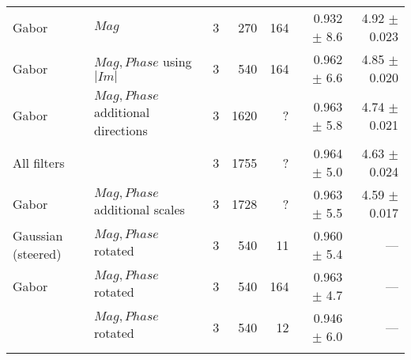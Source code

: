 \begin{tabularx}{\linewidth}{p{3cm} p{3cm} r r r r r}
Gabor   & $Mag$                     & 3 &    270    &164     & 0.932 $\pm$ 8.6  & 4.92 $\pm$  0.023 \\

Gabor   & $Mag,Phase$ using $|Im|$  & 3 &    540    &164     & 0.962 $\pm$ 6.6  & 4.85 $\pm$  0.020 \\

Gabor   & $Mag,Phase$ additional directions
                                    & 3 &   1620    &?       & 0.963 $\pm$ 5.8  & 4.74 $\pm$ 0.021 \\

\multicolumn{2}{l}{All filters}     & 3 &   1755    &?       & 0.964 $\pm$ 5.0  & 4.63 $\pm$ 0.024 \\

Gabor   & $Mag,Phase$ additional scales
                                    & 3 &   1728    &?       & 0.963 $\pm$ 5.5  & 4.59 $\pm$ 0.017 \\

Gaussian (steered)& $Mag,Phase$ rotated
                                    & 3 &    540    & 11     & 0.960 $\pm$ 5.4  & --- \\

Gabor   & $Mag,Phase$ rotated       & 3 &    540    &164     & 0.963 $\pm$ 4.7  & --- \\

\dtcwt{}& $Mag,Phase$ rotated       & 3 &    540    & 12     & 0.946 $\pm$ 6.0  & --- \\

\bottomrule
\noalign{\smallskip}
\end{tabularx}

